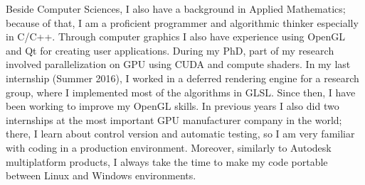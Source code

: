 \documentclass[10pt,stdletter,dateno,sigleft,letterpaper]{newlfm} %
\begin{document}
\begin{newlfm}
Beside Computer Sciences, I also have a background in Applied Mathematics; because of that, I am a proficient programmer and algorithmic thinker especially in C/C++. Through computer graphics I also have experience using OpenGL and Qt for creating user applications. During my PhD, part of my research involved parallelization on GPU using CUDA and compute shaders. In my last internship (Summer 2016), I worked in a deferred rendering engine for a research group, where I implemented most of the algorithms in GLSL. Since then, I have been working to improve my OpenGL skills. In previous years I also did two internships at the most important GPU manufacturer company in the world; there, I learn about control version and automatic testing, so I am very familiar with coding in a production environment. Moreover, similarly to Autodesk multiplatform products, I always take the time to make my code portable between Linux and Windows environments.


\end{newlfm}
\end{document}
